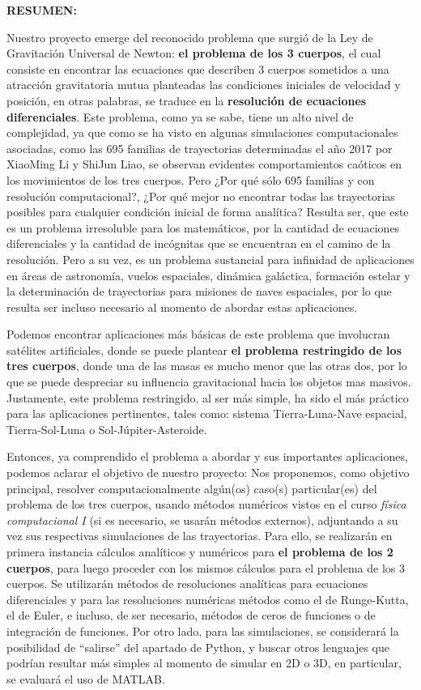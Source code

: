 \documentclass[proyecto.tex]{subfiles}
\begin{document}
\noindent\textbf{RESUMEN:}

\bigskip \noindent \par Nuestro proyecto emerge del reconocido problema que surgió de la Ley de Gravitación Universal de Newton: \textbf{el problema de los 3 cuerpos}, el cual consiste en encontrar las ecuaciones que describen 3 cuerpos sometidos a una atracción gravitatoria mutua planteadas las condiciones iniciales de velocidad y posición, en otras palabras, se traduce en la \textbf{resolución de ecuaciones diferenciales}. Este problema, como ya se sabe, tiene un alto nivel de complejidad, ya que como se ha visto en algunas simulaciones computacionales asociadas, como las 695 familias de trayectorias determinadas el año 2017 por XiaoMing Li y ShiJun Liao, se observan evidentes comportamientos caóticos en los movimientos de los tres cuerpos. Pero ¿Por qué sólo 695 familias y con resolución computacional?, ¿Por qué mejor no encontrar todas las trayectorias posibles para cualquier condición inicial de forma analítica? Resulta ser, que este es un problema irresoluble para los matemáticos, por la cantidad de ecuaciones diferenciales y la cantidad de incógnitas que se encuentran en el camino de la resolución. Pero a su vez, es un problema sustancial para infinidad de aplicaciones en áreas de astronomía, vuelos espaciales, dinámica galáctica, formación estelar y la determinación de trayectorias para misiones de naves espaciales, por lo que resulta ser incluso necesario al momento de abordar estas aplicaciones.

 Podemos encontrar aplicaciones más básicas de este problema que involucran satélites artificiales, donde se puede plantear \textbf{el problema restringido de los tres cuerpos}, donde una de las masas es mucho menor que las otras dos, por lo que se puede despreciar su influencia gravitacional hacia los objetos mas masivos. Justamente, este problema restringido, al ser más simple, ha sido el más práctico para las aplicaciones pertinentes, tales como: sistema Tierra-Luna-Nave espacial, Tierra-Sol-Luna o Sol-Júpiter-Asteroide.

 Entonces, ya comprendido el problema a abordar y sus importantes aplicaciones, podemos aclarar el objetivo de nuestro proyecto: Nos proponemos, como objetivo principal, resolver computacionalmente algún(os) caso(s) particular(es) del problema de los tres cuerpos, usando métodos numéricos vistos en el curso \textit{física computacional I} (si es necesario, se usarán métodos externos), adjuntando a su vez sus respectivas simulaciones de las trayectorias. Para ello, se realizarán en primera instancia cálculos analíticos y numéricos para \textbf{el problema de los 2 cuerpos}, para luego proceder con los mismos cálculos para el problema de los 3 cuerpos. Se utilizarán métodos de resoluciones analíticas para ecuaciones diferenciales y para las resoluciones numéricas métodos como el de Runge-Kutta, el de Euler, e incluso, de ser necesario, métodos de ceros de funciones o de integración de funciones. Por otro lado, para las simulaciones, se considerará la posibilidad de “salirse” del apartado de Python, y buscar otros lenguajes que podrían resultar más simples al momento de simular en 2D o 3D, en particular, se evaluará el uso de MATLAB.
 

\bigskip
\end{document}
